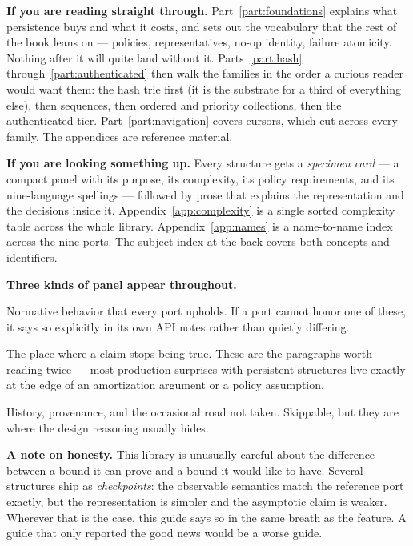 \documentclass[11pt,twoside,openright]{book}
\begin{document}
\bigskip
\noindent\textbf{\sffamily\color{d7ink}If you are reading straight through.}
Part~\ref{part:foundations} explains what persistence buys and what it costs,
and sets out the vocabulary that the rest of the book leans on --- policies,
representatives, no-op identity, failure atomicity. Nothing after it will quite
land without it. Parts~\ref{part:hash} through~\ref{part:authenticated} then walk
the families in the order a curious reader would want them: the hash trie first
(it is the substrate for a third of everything else), then sequences, then
ordered and priority collections, then the authenticated tier. Part~\ref{part:navigation}
covers cursors, which cut across every family. The appendices are reference
material.

\bigskip
\noindent\textbf{\sffamily\color{d7ink}If you are looking something up.}
Every structure gets a \emph{specimen card} --- a compact panel with its purpose,
its complexity, its policy requirements, and its nine-language spellings ---
followed by prose that explains the representation and the decisions inside it.
Appendix~\ref{app:complexity} is a single sorted complexity table across the
whole library. Appendix~\ref{app:names} is a name-to-name index across the nine
ports. The subject index at the back covers both concepts and identifiers.

\bigskip
\noindent\textbf{\sffamily\color{d7ink}Three kinds of panel appear throughout.}

\begin{contractbox}
Normative behavior that every port upholds. If a port cannot honor one of
these, it says so explicitly in its own API notes rather than quietly differing.
\end{contractbox}

\begin{caveatbox}[Caveat]
The place where a claim stops being true. These are the paragraphs worth reading
twice --- most production surprises with persistent structures live exactly at
the edge of an amortization argument or a policy assumption.
\end{caveatbox}

\begin{asidebox}[Aside]
History, provenance, and the occasional road not taken. Skippable, but they are
where the design reasoning usually hides.
\end{asidebox}

\bigskip
\noindent\textbf{\sffamily\color{d7ink}A note on honesty.} This library is
unusually careful about the difference between a bound it can prove and a bound
it would like to have. Several structures ship as \emph{checkpoints}: the
observable semantics match the reference port exactly, but the representation is
simpler and the asymptotic claim is weaker. Wherever that is the case, this
guide says so in the same breath as the feature. A guide that only reported the
good news would be a worse guide.
\end{document}
